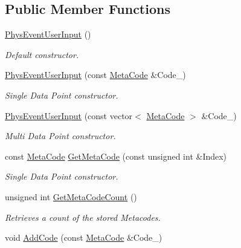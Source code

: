 \subsection*{Public Member Functions}
\begin{DoxyCompactItemize}
\item 
\hyperlink{classPhysEventUserInput_a6f8eaf698e8109d5cb30f2f17044f1ba}{PhysEventUserInput} ()
\begin{DoxyCompactList}\small\item\em Default constructor. \item\end{DoxyCompactList}\item 
\hyperlink{classPhysEventUserInput_ae13b1b02bfa3ef64dc4205478a68810f}{PhysEventUserInput} (const \hyperlink{classMetaCode}{MetaCode} \&Code\_\-)
\begin{DoxyCompactList}\small\item\em Single Data Point constructor. \item\end{DoxyCompactList}\item 
\hyperlink{classPhysEventUserInput_a8b1c0e36d39075dffa4f88d10f2376d9}{PhysEventUserInput} (const vector$<$ \hyperlink{classMetaCode}{MetaCode} $>$ \&Code\_\-)
\begin{DoxyCompactList}\small\item\em Multi Data Point constructor. \item\end{DoxyCompactList}\item 
const \hyperlink{classMetaCode}{MetaCode} \hyperlink{classPhysEventUserInput_aa564530c27f6983bb412e46c2c7ed086}{GetMetaCode} (const unsigned int \&Index)
\begin{DoxyCompactList}\small\item\em Single Data Point constructor. \item\end{DoxyCompactList}\item 
unsigned int \hyperlink{classPhysEventUserInput_a86df812a38566a572134100a422a8799}{GetMetaCodeCount} ()
\begin{DoxyCompactList}\small\item\em Retrieves a count of the stored Metacodes. \item\end{DoxyCompactList}\item 
void \hyperlink{classPhysEventUserInput_a4f5b94c64cd08c15b480e441d25a385d}{AddCode} (const \hyperlink{classMetaCode}{MetaCode} \&Code\_\-)

\end{DoxyCompactItemize}
